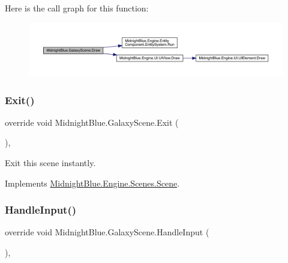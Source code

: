 Here is the call graph for this function\+:
\nopagebreak
\begin{figure}[H]
\begin{center}
\leavevmode
\includegraphics[width=350pt]{class_midnight_blue_1_1_galaxy_scene_a3646fcf97e067bac267d42aad66e71c4_cgraph}
\end{center}
\end{figure}
\hypertarget{class_midnight_blue_1_1_galaxy_scene_a7a96978e050da997330bcc0f3cd00f9e}{}\label{class_midnight_blue_1_1_galaxy_scene_a7a96978e050da997330bcc0f3cd00f9e} 
\subsubsection{\texorpdfstring{Exit()}{Exit()}}
{\footnotesize\ttfamily override void Midnight\+Blue.\+Galaxy\+Scene.\+Exit (\begin{DoxyParamCaption}{ }\end{DoxyParamCaption})\hspace{0.3cm}{\ttfamily [inline]}, {\ttfamily [virtual]}}



Exit this scene instantly. 



Implements \hyperlink{class_midnight_blue_1_1_engine_1_1_scenes_1_1_scene_adbf0f6d758df9fc5e20f24f327599e67}{Midnight\+Blue.\+Engine.\+Scenes.\+Scene}.

\hypertarget{class_midnight_blue_1_1_galaxy_scene_afd7f8c9f6d0cf6ded10299d4b0015c29}{}\label{class_midnight_blue_1_1_galaxy_scene_afd7f8c9f6d0cf6ded10299d4b0015c29} 
\subsubsection{\texorpdfstring{Handle\+Input()}{HandleInput()}}
{\footnotesize\ttfamily override void Midnight\+Blue.\+Galaxy\+Scene.\+Handle\+Input (\begin{DoxyParamCaption}{ }\end{DoxyParamCaption})\hspace{0.3cm}{\ttfamily [inline]}, {\ttfamily [virtual]}}



